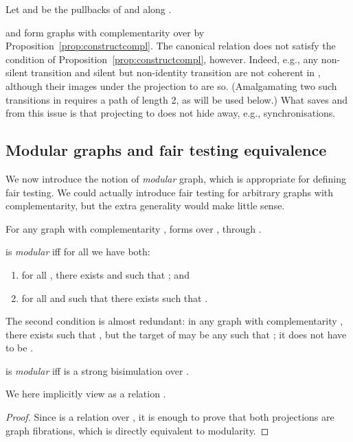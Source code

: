 \documentclass{LMCS}
\theoremstyle{plain}\newtheorem{satz}[thm]{Satz}
\begin{document}
\begin{defi}
  Let  and  be
  the pullbacks of  and  along .   
\end{defi}

\begin{exa}
   and  form graphs with complementarity over  by
  Proposition~\ref{prop:constructcompl}.  The canonical relation
   does not satisfy the condition of
  Proposition~\ref{prop:constructcompl}, however. Indeed, e.g., any
  non-silent transition  and silent but non-identity transition  are not coherent in , although
  their images under the projection to  are so.  (Amalgamating two
  such transitions in  requires a path of length 2, as will be
  used below.) What saves  and  from this issue is that
  projecting to  does not hide away, e.g., synchronisations.
\end{exa}

\subsection{Modular graphs and fair testing equivalence}
We now introduce the notion of \emph{modular} graph, which is
appropriate for defining fair testing. We could actually introduce
fair testing for arbitrary graphs with complementarity, but the extra
generality would make little sense.

For any graph with complementarity ,  forms \anlts{} over
, through .
\begin{defi}
   is \emph{modular} iff for all  we have both:
  \begin{enumerate}
  \item for all , there exists  and
     such that ; and\label{modularity:i}
  \item for all  and  such that 
    there exists  such that . \label{modularity:ii}
  \end{enumerate}
\end{defi}
\begin{rem}
  The second condition is almost redundant: in any graph with
  complementarity , there exists  such that , but the target of  may be any  such that ; it does not have to be .
\end{rem}

\begin{prop}\label{prop:modbis}
    is \emph{modular} iff  is a strong bisimulation
  over .
\end{prop}
We here implicitly view  as a relation .
\begin{proof} 
Since  is a relation over , it is enough to prove that both 
projections are graph fibrations, which is directly equivalent to modularity.
\end{proof}
\end{document}
